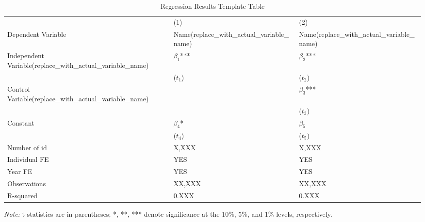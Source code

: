 \begin{table}[htbp]
\caption{Regression Results Template Table}
\label{Use the regression name as the label}
\centering
\begin{tabular}{p{3.6cm}p{3.6cm}p{3.6cm}} %
\toprule
& (1) & (2) \\
Dependent Variable  & Name(replace_with_actual_variable_name)  & Name(replace_with_actual_variable_name) \\
\midrule
Independent Variable(replace_with_actual_variable_name)  & $\beta_1$*** & $\beta_2$*** \\
            & ($t_1$) & ($t_2$) \\
Control Variable(replace_with_actual_variable_name)     &  & $\beta_3$*** \\  %
            &  & ($t_3$) \\
Constant    & $\beta_4$* & $\beta_5$ \\
            & ($t_4$) & ($t_5$) \\

Number of id       & X,XXX        & X,XXX \\
Individual FE      & YES          & YES \\
Year FE            & YES          & YES \\
Observations       & XX,XXX       & XX,XXX \\
R-squared          & 0.XXX        & 0.XXX \\
\bottomrule
\end{tabular}
\begin{tablenotes}
\small
\item \textit{Note:} t-statistics are in parentheses; *, **, *** denote significance at the 10\%, 5\%, and 1\% levels, respectively.
\end{tablenotes}
\end{table}




